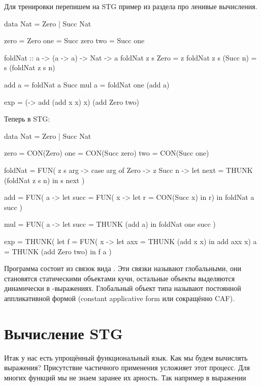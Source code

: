 Для тренировки перепишем на STG пример из раздела про ленивые вычисления.

\begin{code}
data Nat = Zero | Succ Nat

zero    = Zero
one     = Succ zero
two     = Succ one

foldNat :: a -> (a -> a) -> Nat -> a
foldNat z  s  Zero      = z
foldNat z  s  (Succ n)  = s (foldNat z s n)

add a = foldNat a   Succ
mul a = foldNat one (add a) 

exp = (\x -> add (add x x) x) (add Zero two)
\end{code}

Теперь в STG:

\begin{code}
data Nat = Zero | Succ Nat

zero    = CON(Zero)
one     = CON(Succ zero)
two     = CON(Succ one)

foldNat = FUN( z s arg -> 
            case arg of 
                Zero    -> z
                Succ n  -> let next = THUNK (foldNat z s n)
                           in  s next  
          )

add     = FUN( a ->
            let succ = FUN( x -> 
                        let r = CON(Succ x) 
                        in r)
            in  foldNat a succ
          )

mul     = FUN( a -> 
            let succ = THUNK (add a)
            in  foldNat one succ
          )

exp     = THUNK( 
            let f = FUN( x -> let axx = THUNK (add x x)
                              in  add axx x) 
                a = THUNK (add Zero two)
            in  f a    
          )
\end{code}    

Программа состоит из связок вида .
Эти связки называют глобальными, они становятся
статическими объектами кучи, остальные объекты
выделяются динамически в -выражениях.
Глобальный объект типа  называют 
постоянной аппликативной формой (constant applicative form или 
сокращённо CAF).

\section{Вычисление STG}

Итак у нас есть упрощённый функциональный язык. Как мы будем
вычислять выражения? Присутствие частичного применения усложняет
этот процесс. Для многих функций мы не знаем заранее их арность.
Так например в выражении

